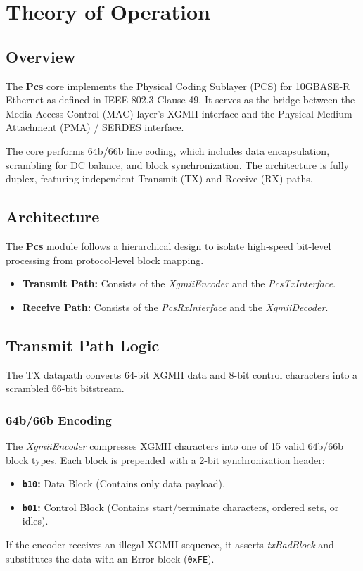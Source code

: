 \section{Theory of Operation}

\subsection{Overview}
The \textbf{Pcs} core implements the Physical Coding Sublayer (PCS) for 10GBASE-R Ethernet as defined in IEEE 802.3 Clause 49. It serves as the bridge between the Media Access Control (MAC) layer’s XGMII interface and the Physical Medium Attachment (PMA) / SERDES interface.

The core performs 64b/66b line coding, which includes data encapsulation, scrambling for DC balance, and block synchronization. The architecture is fully duplex, featuring independent Transmit (TX) and Receive (RX) paths.

\subsection{Architecture}
The \textbf{Pcs} module follows a hierarchical design to isolate high-speed bit-level processing from protocol-level block mapping.
\begin{itemize}
    \item \textbf{Transmit Path:} Consists of the \textit{XgmiiEncoder} and the \textit{PcsTxInterface}.
    \item \textbf{Receive Path:} Consists of the \textit{PcsRxInterface} and the \textit{XgmiiDecoder}.
\end{itemize}



\subsection{Transmit Path Logic}
The TX datapath converts 64-bit XGMII data and 8-bit control characters into a scrambled 66-bit bitstream.

\subsubsection{64b/66b Encoding}
The \textit{XgmiiEncoder} compresses XGMII characters into one of 15 valid 64b/66b block types. Each block is prepended with a 2-bit synchronization header:
\begin{itemize}
    \item \textbf{\texttt{b10}:} Data Block (Contains only data payload).
    \item \textbf{\texttt{b01}:} Control Block (Contains start/terminate characters, ordered sets, or idles).
\end{itemize}
If the encoder receives an illegal XGMII sequence, it asserts \textit{txBadBlock} and substitutes the data with an Error block (\texttt{0xFE}).

